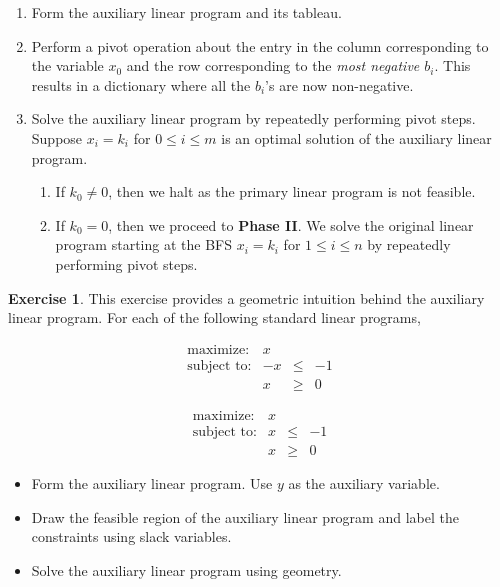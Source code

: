 \documentclass[
]{book}
\providecommand{\tightlist}{%
  \setlength{\itemsep}{0pt}\setlength{\parskip}{0pt}}
\theoremstyle{definition}
\theoremstyle{definition}
\theoremstyle{definition}
\newtheorem{exercise}{Exercise}[chapter]
\theoremstyle{definition}
\theoremstyle{remark}
\begin{document}
\begin{enumerate}
\def\labelenumi{\arabic{enumi}.}
\tightlist
\item
  Form the auxiliary linear program and its tableau.
\item
  Perform a pivot operation about the entry in the column corresponding to the variable \(x_0\) and the row corresponding to the \emph{most negative \(b_i\)}. This results in a dictionary where all the \(b_i\)'s are now non-negative.
\item
  Solve the auxiliary linear program by repeatedly performing pivot steps.
  Suppose \(x_i = k_i\) for \(0 \le i \le m\) is an optimal solution of the auxiliary linear program.

  \begin{enumerate}
  \def\labelenumii{\arabic{enumii}.}
  \tightlist
  \item
    If \(k_0 \neq 0\), then we halt as the primary linear program is not feasible.
  \item
    If \(k_0 = 0\), then we proceed to \textbf{Phase II}. We solve the original linear program starting at the BFS \(x_i = k_i\) for \(1 \le i \le n\) by repeatedly performing pivot steps.
  \end{enumerate}
\end{enumerate}

\begin{exercise}

This exercise provides a geometric intuition behind the auxiliary linear program.
For each of the following standard linear programs,

\begin{equation*}
  \begin{array}{lrllll}
  \mbox{maximize:} & x \\
  \mbox{subject to:} 
  & -x & \le & -1 \\
  & x & \ge & 0
  \end{array}
\end{equation*}

\begin{equation*}
  \begin{array}{lrllll}
  \mbox{maximize:} & x \\
  \mbox{subject to:} 
  & x & \le & -1 \\
  & x & \ge & 0
  \end{array}
\end{equation*}

\begin{itemize}
\tightlist
\item
  Form the auxiliary linear program. Use \(y\) as the auxiliary variable.
\item
  Draw the feasible region of the auxiliary linear program and label the constraints using slack variables.
\item
  Solve the auxiliary linear program using geometry.
\end{itemize}

\end{exercise}
\end{document}
